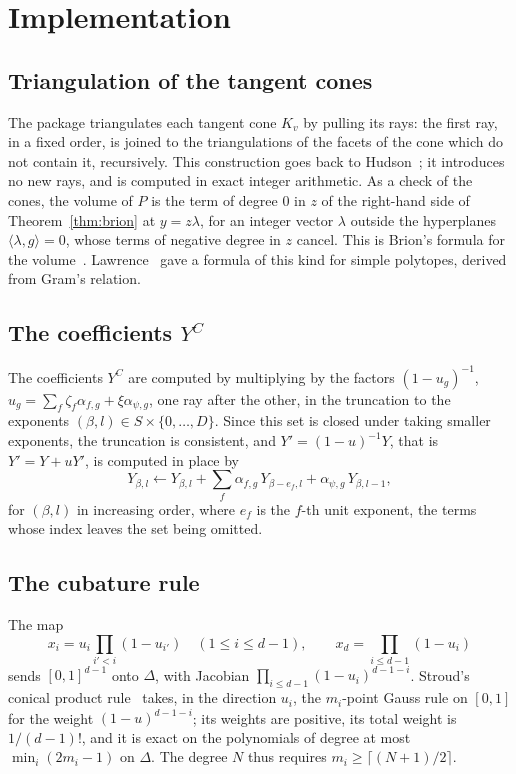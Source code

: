 \documentclass[11pt]{article}
\theoremstyle{remark}
\newcommand{\scal}[2]{\langle #1, #2\rangle}
\begin{document}
\section{Implementation}
\label{sec:implementation}

\subsection{Triangulation of the tangent cones}

The package triangulates each tangent cone $K_v$ by pulling its rays: the
first ray, in a fixed order, is joined to the triangulations of the facets
of the cone which do not contain it, recursively. This construction goes
back to Hudson~\cite[Lemma~1.4]{Hudson}; it introduces no new rays, and is
computed in exact integer arithmetic. As a check of the cones, the volume
of $P$ is the term of degree $0$ in $z$ of the right-hand side of
Theorem~\ref{thm:brion} at $y = z \lambda$, for an integer vector $\lambda$
outside the hyperplanes $\scal{\lambda}{g} = 0$, whose terms of negative
degree in $z$ cancel. This is Brion's formula for the
volume~\cite[\S3.2, Corollaire~2]{Brion}. Lawrence~\cite{Lawrence} gave a
formula of this kind for simple polytopes, derived from Gram's relation.

\subsection{The coefficients \texorpdfstring{$Y^C$}{Y\^{}C}}
\label{sec:coefficients}

The coefficients $Y^C$ are computed by multiplying by the factors $(1 -
u_g)^{-1}$, $u_g = \sum_f \zeta_f \alpha_{f,g} + \xi \alpha_{\psi,g}$, one
ray after the other, in the truncation to the exponents $(\beta, l) \in S
\times \{0, \ldots, D\}$. Since this set is closed under taking smaller
exponents, the truncation is consistent, and $Y' = (1 - u)^{-1} Y$, that is
$Y' = Y + u Y'$, is computed in place by
\[
  Y_{\beta,l} \leftarrow Y_{\beta,l} + \sum_f \alpha_{f,g} \,
  Y_{\beta - e_f, l} + \alpha_{\psi,g} \, Y_{\beta, l - 1},
\]
for $(\beta, l)$ in increasing order, where $e_f$ is the $f$-th unit
exponent, the terms whose index leaves the set being omitted.

\subsection{The cubature rule}
\label{sec:rule}

The map
\[
  x_i = u_i \prod_{i' < i} (1 - u_{i'}) \quad (1 \leq i \leq d - 1), \qquad
  x_d = \prod_{i \leq d - 1} (1 - u_i)
\]
sends $[0, 1]^{d-1}$ onto $\Delta$, with Jacobian $\prod_{i \leq d-1} (1 -
u_i)^{d - 1 - i}$. Stroud's conical product rule~\cite[Section~2.4]{Stroud}
takes, in the direction $u_i$, the $m_i$-point Gauss rule on $[0, 1]$ for
the weight $(1 - u)^{d-1-i}$; its weights are positive, its total weight is
$1/(d-1)!$, and it is exact on the polynomials of degree at most $\min_i
(2 m_i - 1)$ on $\Delta$. The degree $N$ thus requires $m_i \geq \lceil (N +
1)/2 \rceil$.
\end{document}
